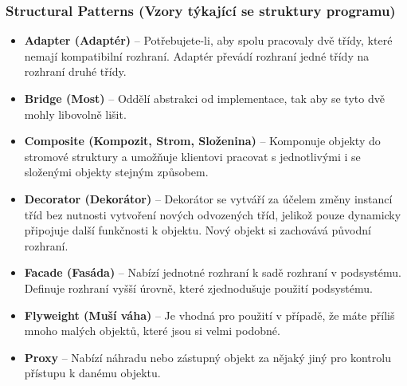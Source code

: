 \subsubsection{Structural Patterns (Vzory týkající se struktury programu)}
\begin{itemize}
	\item \textbf{Adapter (Adaptér)} -- Potřebujete-li, aby spolu pracovaly dvě třídy, které nemají kompatibilní rozhraní. Adaptér převádí rozhraní jedné třídy na rozhraní druhé třídy.
	\item \textbf{Bridge (Most)} -- Oddělí abstrakci od implementace, tak aby se tyto dvě mohly libovolně lišit.
	\item \textbf{Composite (Kompozit, Strom, Složenina)} -- Komponuje objekty do stromové struktury a umožňuje klientovi pracovat s jednotlivými i se složenými objekty stejným způsobem.
	\item \textbf{Decorator (Dekorátor)} -- Dekorátor se vytváří za účelem změny instancí tříd bez nutnosti vytvoření nových odvozených tříd, jelikož pouze dynamicky připojuje další funkčnosti k objektu. Nový objekt si zachovává původní rozhraní.
	\item \textbf{Facade (Fasáda)} -- Nabízí jednotné rozhraní k sadě rozhraní v podsystému. Definuje rozhraní vyšší úrovně, které zjednodušuje použití podsystému.
	\item \textbf{Flyweight (Muší váha)} -- Je vhodná pro použití v případě, že máte příliš mnoho malých objektů, které jsou si velmi podobné.
	\item \textbf{Proxy} -- Nabízí náhradu nebo zástupný objekt za nějaký jiný pro kontrolu přístupu k danému objektu.
\end{itemize}


